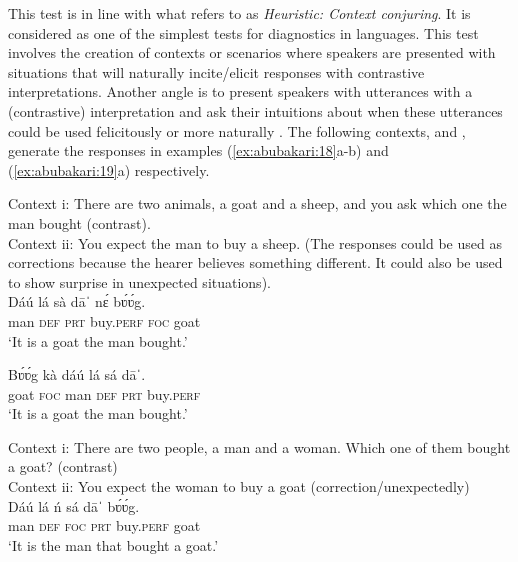 \documentclass[output=paper
,newtxmath
,modfonts
,nonflat]{langsci/langscibook}
\begin{document}
This test is in line with what \citet{vanderWal2013} refers to as \textit{Heuristic: Context conjuring}. It is considered as one of the simplest tests for  diagnostics in languages. This test involves the creation of contexts or scenarios where speakers are presented with situations that will naturally incite/elicit responses with contrastive  interpretations. Another angle is to present speakers with utterances with a (contrastive)  interpretation and ask their intuitions about when these utterances could be used felicitously or more naturally \citep[5]{vanderWal2013}. The following contexts,  and , generate the responses in examples (\ref{ex:abubakari:18}a-b) and (\ref{ex:abubakari:19}a) respectively.

 
\ea\label{ex:abubakari:18} 
Context i: There are two animals, a goat and a sheep, and you ask which one the       man bought (contrast).\\
 
 
Context ii: You expect the man to buy a sheep. (The responses could be used as   corrections because the hearer believes something different. It could also be used to show surprise in unexpected situations).\\
 
\ea\label{ex:abubakari:18a}
\gll Dáú  lá  sà  dāˈ    nɛ́  bʋ́ʋ́g.\\
man  \textsc{def}  \textsc{prt}  buy.\textsc{perf}  \textsc{foc}  goat\\
\glt ‘It is a goat the man bought.’

\ex\label{ex:abubakari:18b}
\gll Bʋ́ʋ́g  kà  dáú  lá  sá  dāˈ. \\        goat  \textsc{foc}  man  \textsc{def}  \textsc{prt}  buy.\textsc{perf} \\
\glt ‘It is a goat the man bought.’
\z
\z

\ea\label{ex:abubakari:19} 
Context i: There are two people, a man and a woman.       Which one of them bought a goat? (contrast)\\
 
Context ii: You expect the woman to buy a goat    
	(correction/unexpectedly)\\

\ea\label{ex:abubakari:19a} 
\gll Dáú  lá  ń  sá  dāˈ    bʋ́ʋ́g.\\
man    \textsc{def}  \textsc{foc}  \textsc{prt}  buy.\textsc{perf}  goat\\
\glt ‘It is the    man   that bought a goat.’
\z
\z 
\end{document}

